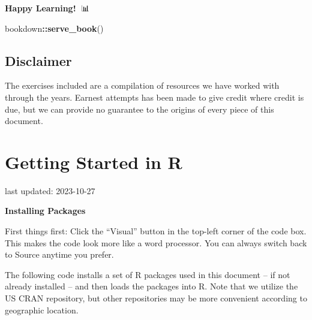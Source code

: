 \documentclass[
]{book}
\newenvironment{Shaded}{\begin{snugshade}}{\end{snugshade}}
\newcommand{\FunctionTok}[1]{\textcolor[rgb]{0.13,0.29,0.53}{\textbf{#1}}}
\newcommand{\NormalTok}[1]{#1}
\newcommand{\SpecialCharTok}[1]{\textcolor[rgb]{0.81,0.36,0.00}{\textbf{#1}}}
\begin{document}
\textbf{Happy Learning!} 🧬📊

\begin{Shaded}
\begin{Highlighting}[]
\NormalTok{bookdown}\SpecialCharTok{::}\FunctionTok{serve\_book}\NormalTok{()}
\end{Highlighting}
\end{Shaded}

\hypertarget{disclaimer}{%
\section{Disclaimer}\label{disclaimer}}

The exercises included are a compilation of resources we have worked with through the years. Earnest attempts has been made to give credit where credit is due, but we can provide no guarantee to the origins of every piece of this document.

\hypertarget{getting-started-in-r}{%
\chapter{Getting Started in R}\label{getting-started-in-r}}

last updated: 2023-10-27

\textbf{Installing Packages}

First things first: Click the ``Visual'' button in the top-left corner of the code box. This makes the code look more like a word processor. You can always switch back to Source anytime you prefer.

The following code installs a set of R packages used in this document -- if not already installed -- and then loads the packages into R. Note that we utilize the US CRAN repository, but other repositories may be more convenient according to geographic location.
\end{document}
